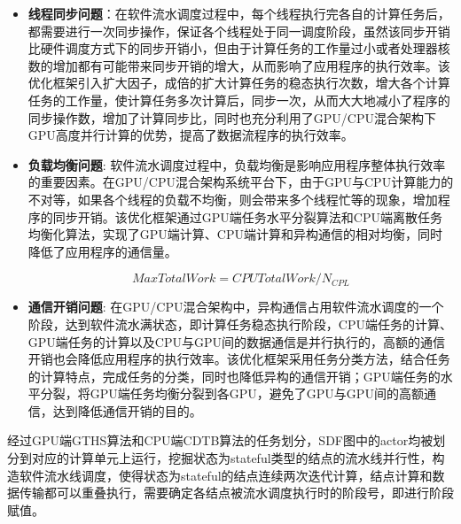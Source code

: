 \begin{itemize}	
  \item {\bf 线程同步问题}：在软件流水调度过程中，每个线程执行完各自的计算任务后，都需要进行一次同步操作，保证各个线程处于同一调度阶段，虽然该同步开销比硬件调度方式下的同步开销小，但由于计算任务的工作量过小或者处理器核数的增加都有可能带来同步开销的增大，从而影响了应用程序的执行效率。该优化框架引入扩大因子，成倍的扩大计算任务的稳态执行次数，增大各个计算任务的工作量，使计算任务多次计算后，同步一次，从而大大地减小了程序的同步操作数，增加了计算同步比，同时也充分利用了GPU/CPU混合架构下GPU高度并行计算的优势，提高了数据流程序的执行效率。

  \item {\bf 负载均衡问题}: 软件流水调度过程中，负载均衡是影响应用程序整体执行效率的重要因素。在GPU/CPU混合架构系统平台下，由于GPU与CPU计算能力的不对等，如果各个线程的负载不均衡，则会带来多个线程忙等的现象，增加程序的同步开销。该优化框架通过GPU端任务水平分裂算法和CPU端离散任务均衡化算法，实现了GPU端计算、CPU端计算和异构通信的相对均衡，同时降低了应用程序的通信量。
  
  \begin{equation}
    MaxTotalWork = CPUTotalWork/N_{CPL} \label{eq:3.2}
  \end{equation}

  \item {\bf 通信开销问题}: 在GPU/CPU混合架构中，异构通信占用软件流水调度的一个阶段，达到软件流水满状态，即计算任务稳态执行阶段，CPU端任务的计算、GPU端任务的计算以及CPU与GPU间的数据通信是并行执行的，高额的通信开销也会降低应用程序的执行效率。该优化框架采用任务分类方法，结合任务的计算特点，完成任务的分类，同时也降低异构的通信开销；GPU端任务的水平分裂，将GPU端任务均衡分裂到各GPU，避免了GPU与GPU间的高额通信，达到降低通信开销的目的。
\end{itemize}

经过GPU端GTHS算法和CPU端CDTB算法的任务划分，SDF图中的actor均被划分到对应的计算单元上运行，挖掘状态为stateful类型的结点的流水线并行性，构造软件流水线调度，使得状态为stateful的结点连续两次迭代计算，结点计算和数据传输都可以重叠执行，需要确定各结点被流水调度执行时的阶段号，即进行阶段赋值。

